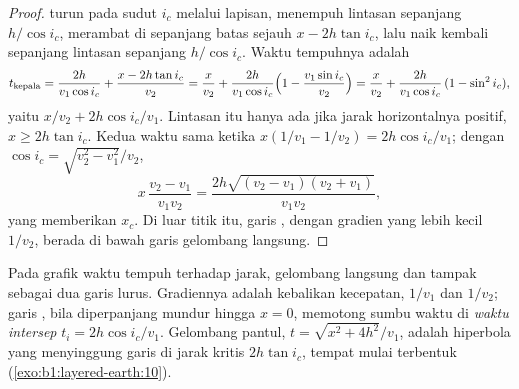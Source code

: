 \begin{proof}
 turun pada sudut $i_c$ melalui lapisan, menempuh lintasan sepanjang $h/\cos i_c$, merambat di sepanjang batas sejauh $x - 2h\tan i_c$, lalu naik kembali sepanjang lintasan sepanjang $h/\cos i_c$. Waktu tempuhnya adalah
\[
  t_{\text{kepala}} = \frac{2h}{v_1\cos i_c} + \frac{x - 2h\tan i_c}{v_2}
  = \frac{x}{v_2} + \frac{2h}{v_1\cos i_c}\Bigl(1 - \frac{v_1\sin i_c}{v_2}\Bigr)
  = \frac{x}{v_2} + \frac{2h}{v_1\cos i_c}\,(1 - \sin^2 i_c),
\]
yaitu $x/v_2 + 2h\cos i_c/v_1$. Lintasan itu hanya ada jika jarak horizontalnya positif, $x \ge 2h\tan i_c$. Kedua waktu sama ketika $x(1/v_1 - 1/v_2) = 2h\cos i_c/v_1$; dengan $\cos i_c = \sqrt{v_2^2 - v_1^2}/v_2$,
\[
  x\,\frac{v_2 - v_1}{v_1 v_2} = \frac{2h\sqrt{(v_2 - v_1)(v_2 + v_1)}}{v_1 v_2},
\]
yang memberikan $x_c$. Di luar titik itu, garis , dengan gradien yang lebih kecil $1/v_2$, berada di bawah garis gelombang langsung.
\end{proof}

Pada grafik waktu tempuh terhadap jarak, gelombang langsung dan  tampak sebagai dua garis lurus. Gradiennya adalah kebalikan kecepatan, $1/v_1$ dan $1/v_2$; garis , bila diperpanjang mundur hingga $x = 0$, memotong sumbu waktu di \emph{waktu intersep} $t_i = 2h\cos i_c/v_1$. Gelombang pantul, $t = \sqrt{x^2 + 4h^2}/v_1$, adalah hiperbola yang menyinggung garis  di jarak kritis $2h\tan i_c$, tempat  mulai terbentuk (\cref{exo:b1:layered-earth:10}).

